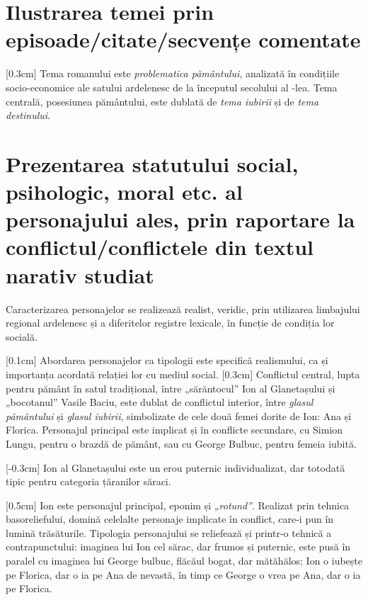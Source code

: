 \documentclass[
12pt,
a4paper
]{article}
\newcommand{\rom}[1]{\uppercase\expandafter{\romannumeral #1\relax}} %
\begin{document}
\section{Ilustrarea temei prin episoade/citate/secvențe comentate}

[0.3cm]
Tema romanului este \textit{problematica pământului}, analizată în condițiile socio-e\-co\-no\-mi\-ce ale satului ardelenesc de la începutul secolului al \rom{20}-lea. Tema centrală, posesiunea pământului, este dublată de \textit{tema iubirii} și de \textit{tema destinului}.

\section{Prezentarea statutului social, psihologic, moral etc. al personajului ales, prin raportare la conflictul/conflictele din textul narativ studiat}

Caracterizarea personajelor se realizează realist, veridic, prin utilizarea limbajului regional ardelenesc și a diferitelor registre lexicale, în funcție de condiția lor socială.

[0.1cm]
Abordarea personajelor ca tipologii este specifică realismului, ca și importanța acordată relației lor cu mediul social.
[0.3cm]
Conflictul central, lupta pentru pământ în satul tradițional, între „sărăntocul” Ion al Glanetașului și „bocotanul” Vasile Baciu, este dublat de conflictul interior, între \textit{glasul pământului} și \textit{glasul iubirii}, simbolizate de cele două femei dorite de Ion: Ana și Florica. Personajul principal este implicat și în conflicte secundare, cu Simion Lungu, pentru o brazdă de pământ, sau cu George Bulbuc, pentru femeia iubită.

[-0.3cm]
Ion al Glanetașului este un erou puternic individualizat, dar totodată tipic pentru categoria țăranilor săraci.

[0.5cm]
Ion este personajul principal, eponim și \textit{„rotund”}. Realizat prin tehnica basoreliefului, domină celelalte personaje implicate în conflict, care-i pun în lumină trăsăturile. Tipologia personajului se reliefează și printr-o tehnică a contrapunctului: imaginea lui Ion cel sărac, dar frumos și puternic, este pusă în paralel cu imaginea lui George bulbuc, flăcăul bogat, dar mătăhălos; Ion o iubește pe Florica, dar o ia pe Ana de nevastă, în timp ce George o vrea pe Ana, dar o ia pe Florica.
\end{document}
